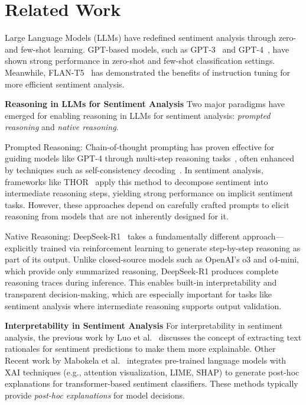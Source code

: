 \documentclass{IEEEcsmag}
\begin{document}
\vspace{-20pt}
\section{Related Work}

Large Language Models (LLMs) have redefined sentiment analysis through zero- and few-shot learning. GPT-based models, such as GPT-3~\cite{brown2020language} and GPT-4~\cite{zhang2023sentiment}, have shown strong performance in zero-shot and few-shot classification settings. Meanwhile, FLAN-T5~\cite{ghatora2024sentiment} has demonstrated the benefits of instruction tuning for more efficient sentiment analysis.

\noindent\textbf{Reasoning in LLMs for Sentiment Analysis}
Two major paradigms have emerged for enabling reasoning in LLMs for sentiment analysis: \textit{prompted reasoning} and \textit{native reasoning}.

Prompted Reasoning:
Chain-of-thought prompting has proven effective for guiding models like GPT-4 through multi-step reasoning tasks~\cite{lu2024analysis}, often enhanced by techniques such as self-consistency decoding~\cite{zhang2025enhancing}. In sentiment analysis, frameworks like THOR~\cite{fei2023thor} apply this method to decompose sentiment into intermediate reasoning steps, yielding strong performance on implicit sentiment tasks. However, these approaches depend on carefully crafted prompts to elicit reasoning from models that are not inherently designed for it.

Native Reasoning:
DeepSeek-R1~\cite{guo2025deepseek} takes a fundamentally different approach—explicitly trained via reinforcement learning to generate step-by-step reasoning as part of its output. Unlike closed-source models such as OpenAI’s o3 and o4-mini, which provide only summarized reasoning, DeepSeek-R1 produces complete reasoning traces during inference. This enables built-in interpretability and transparent decision-making, which are especially important for tasks like sentiment analysis where intermediate reasoning supports output validation.

\noindent\textbf{Interpretability in Sentiment Analysis}
For interpretability in sentiment analysis, the previous work by Luo et al.~\cite{luo2024local} discusses the concept of extracting text rationales for sentiment predictions to make them more explainable. Other Recent work by Mabokela et al.~\cite{mabokela2024explainable} integrates pre-trained language models with XAI techniques (e.g., attention visualization, LIME, SHAP) to generate post-hoc explanations for transformer-based sentiment classifiers. These methods typically provide \textit{post-hoc explanations} for model decisions.
\end{document}
